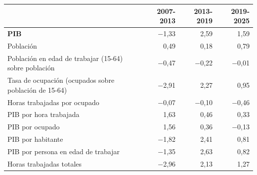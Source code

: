 \setlength{\anchonum}{\dimexpr(\linewidth-\anchoetq)/3-2\tabcolsep\relax}
\begin{tabular}{@{}>{\raggedright\arraybackslash}p{\dimexpr\anchoetq-\tabcolsep\relax}*{3}{N}@{}}
\toprule
{} & \textbf{2007-2013} & \textbf{2013-2019} & \textbf{2019-2025} \\
\midrule
\textbf{PIB} & $-$1{,}33 & 2{,}59 & 1{,}59 \\
\hspace*{0.8em}Población & 0{,}49 & 0{,}18 & 0{,}79 \\
\hspace*{0.8em}Población en edad de trabajar (15-64) sobre población & $-$0{,}47 & $-$0{,}22 & $-$0{,}01 \\
\hspace*{0.8em}Tasa de ocupación (ocupados sobre población de 15-64) & $-$2{,}91 & 2{,}27 & 0{,}95 \\
\hspace*{0.8em}Horas trabajadas por ocupado & $-$0{,}07 & $-$0{,}10 & $-$0{,}46 \\
\hspace*{0.8em}PIB por hora trabajada & 1{,}63 & 0{,}46 & 0{,}33 \\
PIB por ocupado & 1{,}56 & 0{,}36 & $-$0{,}13 \\
PIB por habitante & $-$1{,}82 & 2{,}41 & 0{,}81 \\
PIB por persona en edad de trabajar & $-$1{,}35 & 2{,}63 & 0{,}82 \\
Horas trabajadas totales & $-$2{,}96 & 2{,}13 & 1{,}27 \\
\bottomrule
\end{tabular}
